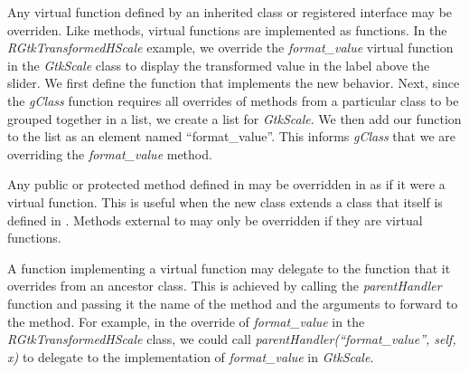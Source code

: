 \documentclass[article]{jss}
\begin{document}
Any virtual function defined by an inherited class or registered
interface may be overriden. Like methods, virtual functions are
implemented as  functions.
In the \emph{RGtkTransformedHScale} example, we override the
\emph{format\_value} virtual function in the \emph{GtkScale} class to display the transformed value in the label above the slider. We first define the  function that implements the new behavior. Next, since the \emph{gClass} function requires all overrides of methods from a particular class to be grouped together in a list, we create a list for \emph{GtkScale}. We then add our  function to the list as an element named ``format\_value''. This informs \emph{gClass} that we are overriding the \emph{format\_value} method. 

Any public or protected method defined in  may be overridden in  as if it were a virtual function. This is useful when the new class extends a class that itself is defined in
. Methods external to  may only be overridden
if they are virtual functions.

A function implementing a
virtual function may delegate to the function that it overrides from an ancestor class. This is achieved by calling the \emph{parentHandler} function and passing it the name of the method and the arguments to forward to the method. For example, in the override of \emph{format\_value} in the \emph{RGtkTransformedHScale} class, we could call \emph{parentHandler(``format\_value'', self, x)} to delegate to the implementation of \emph{format\_value} in \emph{GtkScale}.


\end{document}
